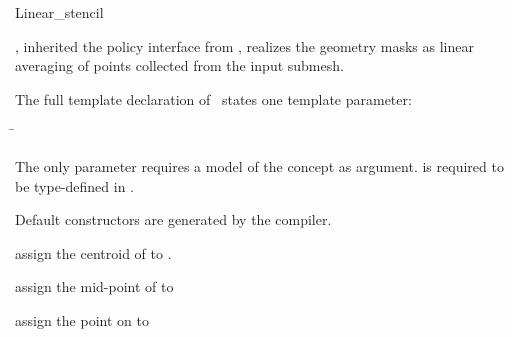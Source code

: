 \begin{ccRefClass}{Linear_stencil}

\ccDefinition

\ccClassTemplateName , inherited the policy interface from
, realizes the geometry masks as linear 
averaging of points collected from the input submesh.


\ccParameters

The full template declaration of \ccClassTemplateName\ states one
template parameter:

\begin{tabbing}
 \= 
\end{tabbing}
   
The only parameter requires a model of 
the  concept as argument. 
 is required to be type-defined in .

\ccCreation

Default constructors are generated by the compiler.


\ccThree{}{}{}

{assign the centroid of  to .}

{assign the mid-point of  to }

{assign the point on  to }

\ccSeeAlso

\\
\\
\\
\\
\\

\end{ccRefClass}

\ccRefPageEnd



